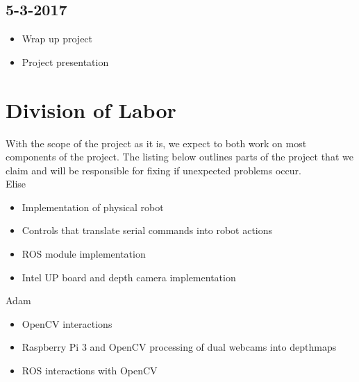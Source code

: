 \documentclass[11pt]{amsart}
\begin{document}
\subsection*{5-3-2017}
\begin{itemize}
\item Wrap up project
\item Project presentation
\end{itemize}

\section{Division of Labor}
With the scope of the project as it is, we expect to both work on most components of the project.  The listing below outlines parts of the project that we claim and will be responsible for fixing if unexpected problems occur.\\

Elise
\begin{itemize}
\item Implementation of physical robot
\item Controls that translate serial commands into robot actions
\item ROS module implementation
\item Intel UP board and depth camera implementation
\end{itemize}

Adam
\begin{itemize}
\item OpenCV interactions
\item Raspberry Pi 3 and OpenCV processing of dual webcams into depthmaps
\item ROS interactions with OpenCV
\end{itemize}
\end{document}
